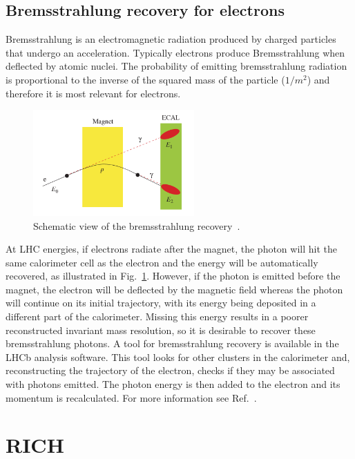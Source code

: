 \subsection{Bremsstrahlung recovery for electrons}

Bremsstrahlung is an electromagnetic radiation produced by charged particles that undergo an acceleration. 
Typically electrons produce Bremsstrahlung when deflected by atomic nuclei.
The probability of emitting bremsstrahlung radiation is proportional to the inverse of the squared mass of the
particle ($1/m^2$) and therefore it is most relevant for electrons.
%
\begin{figure}[h!]
\centering
\includegraphics[width=0.55\textwidth]{RKst/figs/brem_recovery.png}
\caption{Schematic view of the bremsstrahlung recovery~\cite{Alves:2008zz}. }
\label{fig:bremreco}
\end{figure}
%
At LHC energies, if electrons radiate after the magnet, the photon will hit the same calorimeter cell
 as the electron and the energy will be automatically recovered, as illustrated in Fig.~\ref{fig:bremreco}.
However, if the photon is emitted before the magnet, the electron will be deflected by the magnetic
field whereas the photon will continue on its initial trajectory, with its energy being deposited in a different
part of the calorimeter. Missing this energy results in a poorer reconstructed invariant mass resolution, so it is
desirable to recover these bremsstrahlung photons. A tool for bremsstrahlung recovery is available
in the LHCb analysis software. This tool looks for other clusters in the calorimeter and, reconstructing the trajectory
of the electron, checks if they may be associated with photons emitted. The photon energy is then added to 
the electron and its momentum is recalculated. 
For more information see Ref.~\cite{LHCb:2003ab}.

\section{RICH}

